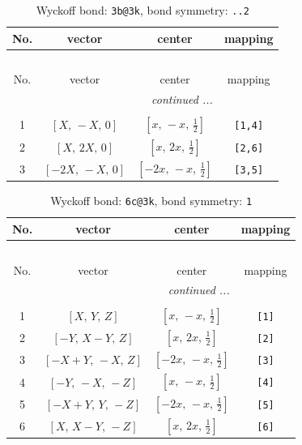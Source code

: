 \documentclass[fleqn,8pt]{jsarticle}
\begin{document}
\renewcommand{\arraystretch}{1.2}
\begin{longtable}{cccc}
\caption{Wyckoff bond: {\tt 3b@3k}, bond symmetry: {\tt ..2}}
 \\
 \hline \hline
No. & vector & center & mapping \\ \hline \endfirsthead

\multicolumn{3}{l}{\tablename\ \thetable{}} \\
 \hline \hline
No. & vector & center & mapping \\ \hline \endhead

 \hline \hline
\multicolumn{3}{r}{\footnotesize\it continued ...} \\ \endfoot

 \hline \hline
\multicolumn{3}{r}{} \\ \endlastfoot

1 & $\left[ X,\, - X,\, 0 \right]$ & $\left[ x,\, - x,\, \frac{1}{2} \right]$ & {\tt [1,4]} \\ \hline
2 & $\left[ X,\, 2 X,\, 0 \right]$ & $\left[ x,\, 2 x,\, \frac{1}{2} \right]$ & {\tt [2,6]} \\ \hline
3 & $\left[ - 2 X,\, - X,\, 0 \right]$ & $\left[ - 2 x,\, - x,\, \frac{1}{2} \right]$ & {\tt [3,5]} \\
\end{longtable}
\renewcommand{\arraystretch}{1.2}
\begin{longtable}{cccc}
\caption{Wyckoff bond: {\tt 6c@3k}, bond symmetry: {\tt 1}}
 \\
 \hline \hline
No. & vector & center & mapping \\ \hline \endfirsthead

\multicolumn{3}{l}{\tablename\ \thetable{}} \\
 \hline \hline
No. & vector & center & mapping \\ \hline \endhead

 \hline \hline
\multicolumn{3}{r}{\footnotesize\it continued ...} \\ \endfoot

 \hline \hline
\multicolumn{3}{r}{} \\ \endlastfoot

1 & $\left[ X,\, Y,\, Z \right]$ & $\left[ x,\, - x,\, \frac{1}{2} \right]$ & {\tt [1]} \\ \hline
2 & $\left[ - Y,\, X - Y,\, Z \right]$ & $\left[ x,\, 2 x,\, \frac{1}{2} \right]$ & {\tt [2]} \\ \hline
3 & $\left[ - X + Y,\, - X,\, Z \right]$ & $\left[ - 2 x,\, - x,\, \frac{1}{2} \right]$ & {\tt [3]} \\ \hline
4 & $\left[ - Y,\, - X,\, - Z \right]$ & $\left[ x,\, - x,\, \frac{1}{2} \right]$ & {\tt [4]} \\ \hline
5 & $\left[ - X + Y,\, Y,\, - Z \right]$ & $\left[ - 2 x,\, - x,\, \frac{1}{2} \right]$ & {\tt [5]} \\ \hline
6 & $\left[ X,\, X - Y,\, - Z \right]$ & $\left[ x,\, 2 x,\, \frac{1}{2} \right]$ & {\tt [6]} \\
\end{longtable}
\end{document}

